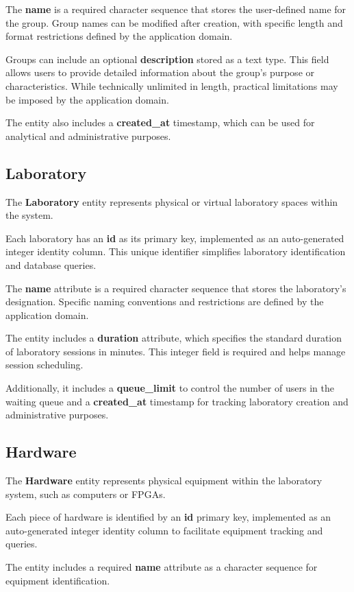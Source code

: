 The \textbf{name} is a required character sequence that stores the user-defined name for the group. Group names can be modified after creation, with specific length and format restrictions defined by the application domain.

Groups can include an optional \textbf{description} stored as a text type. This field allows users to provide detailed information about the group's purpose or characteristics. While technically unlimited in length, practical limitations may be imposed by the application domain.

The entity also includes a \textbf{created\_at} timestamp, which can be used for analytical and administrative purposes.

\subsection{Laboratory}
The \textbf{Laboratory} entity represents physical or virtual laboratory spaces within the system.

Each laboratory has an \textbf{id} as its primary key, implemented as an auto-generated integer identity column. This unique identifier simplifies laboratory identification and database queries.

The \textbf{name} attribute is a required character sequence that stores the laboratory's designation. Specific naming conventions and restrictions are defined by the application domain.

The entity includes a \textbf{duration} attribute, which specifies the standard duration of laboratory sessions in minutes. This integer field is required and helps manage session scheduling.

Additionally, it includes a \textbf{queue\_limit} to control the number of users in the waiting queue and a \textbf{created\_at} timestamp for tracking laboratory creation and administrative purposes.

\subsection{Hardware}
The \textbf{Hardware} entity represents physical equipment within the laboratory system, such as computers or FPGAs.

Each piece of hardware is identified by an \textbf{id} primary key, implemented as an auto-generated integer identity column to facilitate equipment tracking and queries.

The entity includes a required \textbf{name} attribute as a character sequence for equipment identification.

